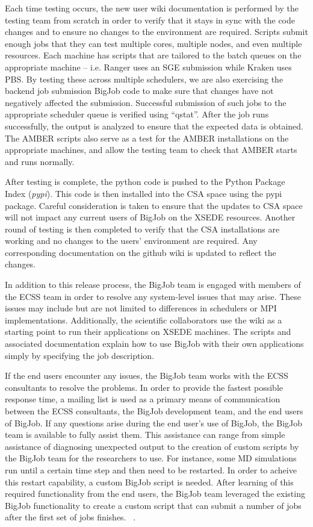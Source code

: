 \documentclass{sig-alternate}
\begin{document}
Each time testing occurs, the new user wiki documentation is performed by the testing team from scratch
in order to verify that it stays in sync with the code changes and to ensure no changes to the
environment are required. Scripts submit enough jobs that they can test multiple cores, 
multiple nodes, and even multiple resources. Each machine has scripts that are tailored to the batch queues on the appropriate machine -- i.e. Ranger uses an SGE submission while Kraken uses PBS. By testing these across multiple schedulers, we are also exercising the backend job submission BigJob code to make sure that changes have not negatively affected the submission. Successful submission of such jobs to the appropriate scheduler
queue is verified using ``qstat''. After the job runs successfully, the output is analyzed to ensure that the expected data is obtained. The AMBER scripts also serve as a test for the AMBER installations on the appropriate machines, and allow the testing team to check that AMBER starts and runs normally.

After testing is complete, the python code is pushed to the Python Package Index
(\textit{pypi}). This code is then installed into the CSA space using the pypi
package. Careful consideration is taken to ensure that the updates to CSA space
will not impact any current users of BigJob on the XSEDE resources. Another round of testing 
is then completed to verify that the CSA installations are working and no changes to 
the users' environment are required. Any corresponding documentation on the 
github wiki is updated to reflect the changes.

In addition to this release process, the BigJob team is engaged with members
of the ECSS team in order to resolve any system-level issues that may arise.
These issues may include but are not limited to differences in schedulers or MPI
implementations. Additionally, the scientific collaborators use the wiki as a
starting point to run their applications on XSEDE machines. The scripts and
associated documentation explain how to use BigJob with their own applications
simply by specifying the job description. 

If the end users encounter any issues, the BigJob team works with the ECSS
consultants to resolve the problems. In order to provide the fastest possible
response time, a mailing list is used as a primary means of communication
between the ECSS consultants, the BigJob development team, and the end users of
BigJob. If any questions arise during the end user's use of BigJob, the
BigJob team is available to fully assist them. This assistance can range from
simple assistance of diagnosing unexpected output to  the creation of custom scripts 
by the BigJob team for the researchers to use. For instance, some MD simulations run 
until a certain time step and then need to be restarted. In order to acheive this restart 
capability, a custom BigJob script is needed. After learning of this required functionality
from the end users, the BigJob team leveraged the existing BigJob functionality to create a 
custom script that can submit a number of jobs after the first set of jobs finishes.
~. 
\end{document}
